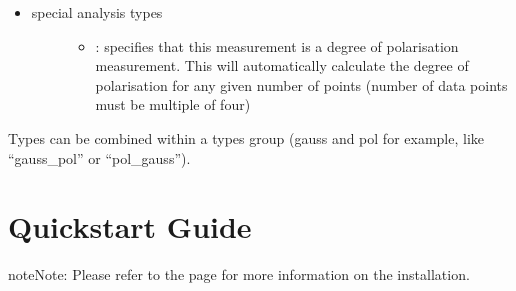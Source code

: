 \documentclass[letterpaper,10pt,english]{sphinxmanual}
\begin{document}
\begin{itemize}
\begin{description}
\begin{itemize}
\begin{description}
\end{description}

\item {} \begin{description}
\item[{special analysis types}] \leavevmode\begin{itemize}
\item {} 
: specifies that this measurement is a degree of polarisation measurement. This will automatically calculate the degree of polarisation for any given number of points (number of data points must be multiple of four)

\end{itemize}

\end{description}

\end{itemize}

\end{description}

\end{itemize}

Types can be combined within a types group (gauss and pol for example, like “gauss\_pol” or “pol\_gauss”).


\chapter{Quickstart Guide}
\label{\detokenize{quickstart:quickstart-guide}}\label{\detokenize{quickstart::doc}}
\begin{sphinxadmonition}{note}{Note:}
Please refer to the {\hyperref[\detokenize{installation:installation}]{}} page for more information on the installation.
\end{sphinxadmonition}
\end{document}
